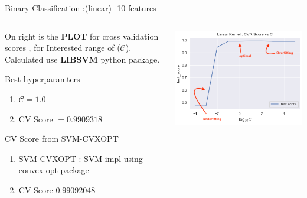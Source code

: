 \documentclass[12pt,t]{beamer}
\begin{document}

\begin{frame}[t]{Binary Classification :(linear) -10 features}
    \scriptsize

    \begin{columns}
        \begin{column}[T]{0.35\linewidth}
            On right is the \textbf{PLOT} for cross validation scores , for Interested range
            of ($\mathcal{C}$). \\ 

            Calculated use \textbf{LIBSVM} python package.


            \begin{block}{Best hyperparamters}
                \begin{enumerate}
                    \item  $\mathcal{C} = 1.0$ 
                    \item CV Score  $ = 0.9909318$
                \end{enumerate}
                    
            \end{block}

            \begin{block}{CV Score from SVM-CVXOPT}
                \begin{enumerate}
                    \item SVM-CVXOPT : SVM impl using convex opt package
                    \item CV Score $0.99092048$
                \end{enumerate}
            \end{block}
  
        \end{column}
        \begin{column}[T]{0.7\linewidth}
            \includegraphics[width=\linewidth]{images/p1a/2(binary clf)/classes1and4_libsvm_linear10f.png}
        \end{column}
    \end{columns}
\end{frame}
\end{document}
